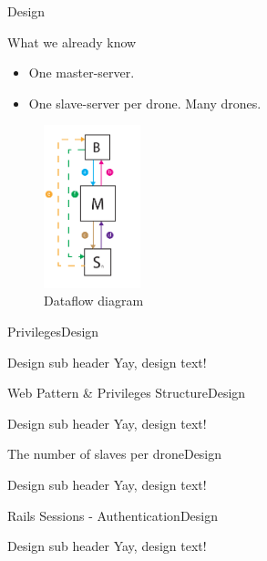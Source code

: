\begin{frame}{Design}
  \begin{block}{What we already know}
  \begin{itemize}
  	\item One master-server.
  	\item One slave-server per drone. Many drones. 
  \end{itemize}

  \begin{figure}[htb]
    \centering
    \includegraphics[width=0.25\textwidth]{gfx/dataflow_diagram.pdf}
    \caption{Dataflow diagram}
  \end{figure}

  \end{block}
\end{frame}

\begin{frame}{Privileges}{Design}
  \begin{block}{Design sub header}
  	Yay, design text!
  \end{block}
\end{frame}

\begin{frame}{Web Pattern \& Privileges Structure}{Design}
  \begin{block}{Design sub header}
  	Yay, design text!
  \end{block}
\end{frame}

\begin{frame}{The number of slaves per drone}{Design}
  \begin{block}{Design sub header}
  	Yay, design text!
  \end{block}
\end{frame}

\begin{frame}{Rails Sessions - Authentication}{Design}
  \begin{block}{Design sub header}
  	Yay, design text!
  \end{block}
\end{frame}